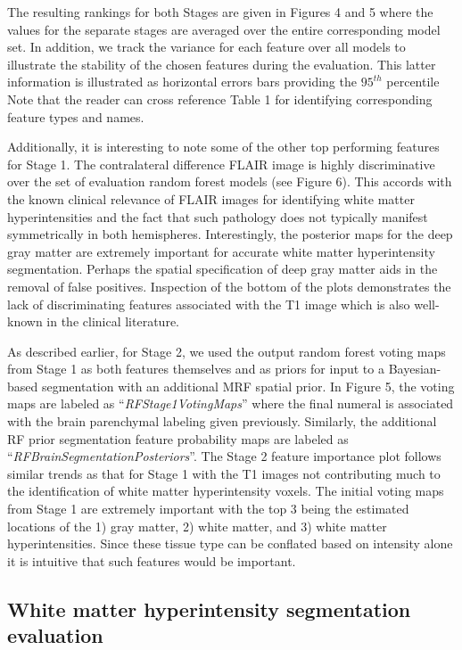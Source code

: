\documentclass[11pt,]{article}
\begin{document}
The resulting rankings for both Stages are given in Figures 4 and 5
where the values for the separate stages are averaged over the entire
corresponding model set. In addition, we track the variance for each
feature over all models to illustrate the stability of the chosen
features during the evaluation. This latter information is illustrated
as horizontal errors bars providing the \(95^{th}\) percentile Note that
the reader can cross reference Table 1 for identifying corresponding
feature types and names.

Additionally, it is interesting to note some of the other top performing
features for Stage 1. The contralateral difference FLAIR image is highly
discriminative over the set of evaluation random forest models (see
Figure 6). This accords with the known clinical relevance of FLAIR
images for identifying white matter hyperintensities and the fact that
such pathology does not typically manifest symmetrically in both
hemispheres. Interestingly, the posterior maps for the deep gray matter
are extremely important for accurate white matter hyperintensity
segmentation. Perhaps the spatial specification of deep gray matter aids
in the removal of false positives. Inspection of the bottom of the plots
demonstrates the lack of discriminating features associated with the T1
image which is also well-known in the clinical literature.

As described earlier, for Stage 2, we used the output random forest
voting maps from Stage 1 as both features themselves and as priors for
input to a Bayesian-based segmentation with an additional MRF spatial
prior. In Figure 5, the voting maps are labeled as
``\emph{RFStage1VotingMaps}'' where the final numeral is associated with
the brain parenchymal labeling given previously. Similarly, the
additional RF prior segmentation feature probability maps are labeled as
``\emph{RFBrainSegmentationPosteriors}''. The Stage 2 feature importance
plot follows similar trends as that for Stage 1 with the T1 images not
contributing much to the identification of white matter hyperintensity
voxels. The initial voting maps from Stage 1 are extremely important
with the top 3 being the estimated locations of the 1) gray matter, 2)
white matter, and 3) white matter hyperintensities. Since these tissue
type can be conflated based on intensity alone it is intuitive that such
features would be important.

\subsection{White matter hyperintensity segmentation
evaluation}\label{white-matter-hyperintensity-segmentation-evaluation}
\end{document}
